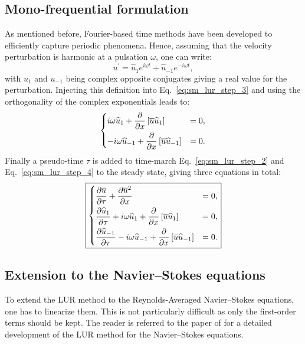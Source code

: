 \subsection{Mono-frequential formulation}
As mentioned before, Fourier-based time methods have been developed to efficiently
capture periodic phenomena.
Hence, assuming that the velocity perturbation is harmonic at 
a pulsation $\omega$, one can write:
\begin{equation}
	u^\prime = \widehat{u}_1 e^{i \omega t} + \widehat{u}_{-1} e^{-i \omega t},
\end{equation}
with $u_1$ and $u_{-1}$ being complex opposite conjugates giving a
real value for the perturbation.
Injecting this definition into Eq.~\eqref{eq:sm_lur_step_3} and using
the orthogonality of the complex exponentials leads
to:
\begin{equation}
	\begin{dcases}
		i \omega \widehat{u}_1 +
		\frac{\partial}{\partial x} \left[
		\overline{u} \widehat{u}_1 \right] &= 
		0, \\
		-i \omega \widehat{u}_{-1} +
		\frac{\partial}{\partial x} \left[
		\overline{u} \widehat{u}_{-1} \right] &= 
		0.
	\end{dcases}
	\label{eq:sm_lur_step_4}
\end{equation}
Finally a pseudo-time $\tau$ is added to time-march 
Eq.~\eqref{eq:sm_lur_step_2} and Eq.~\eqref{eq:sm_lur_step_4}
to the steady state, giving three equations in total:
\begin{equation}
	\fbox{$
	\begin{dcases}
		\frac{\partial \overline{u}}{\partial \tau} +
		\frac{\partial 
			\overline{u}^2}{\partial x} &= 0, \\
		\frac{\partial \widehat{u}_1}{\partial \tau} +
		i \omega \widehat{u}_1 +
			\frac{\partial}{\partial x} \left[
			\overline{u} \widehat{u}_1 \right] &= 
			0, \\
		\frac{\partial \widehat{u}_{-1}}{\partial \tau}
		-i \omega \widehat{u}_{-1} +
			\frac{\partial}{\partial x} \left[
			\overline{u} \widehat{u}_{-1} \right] &= 
			0.
	\end{dcases}
	$}
\end{equation}

\subsection{Extension to the Navier--Stokes equations}
To extend the LUR method to the Reynolds-Averaged
Navier--Stokes equations, one has to linearize them. This
is not particularly difficult as only the first-order terms should
be kept. The reader is referred to the paper of \citet{Clark2000} for
a detailed development of the LUR method for the Navier--Stokes
equations.

